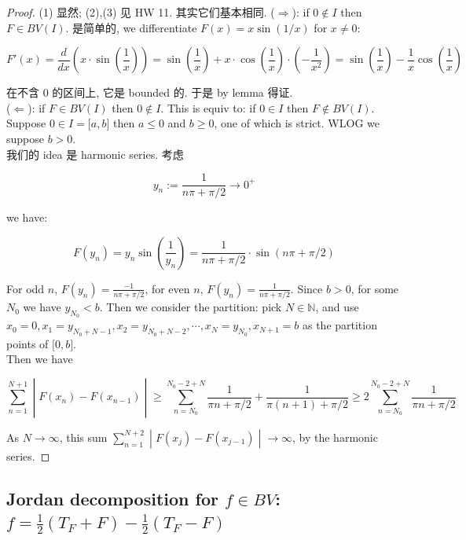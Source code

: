 \begin{proof}

(1) 显然; (2),(3) 见 HW 11. 其实它们基本相同. (\(\Longrightarrow\)): if \(0 \notin I\) then \(F \in BV(I)\). 是简单的, we differentiate \(F(x) = x\sin(1/x)\) for \(x \neq 0\):

\[F'(x) = \frac{d}{dx}\left( {x \cdot \sin\left( \frac{1}{x} \right)} \right) = \sin\left( \frac{1}{x} \right) + x \cdot \cos\left( \frac{1}{x} \right) \cdot \left( {- \frac{1}{x^{2}}} \right) = \sin\left( \frac{1}{x} \right) - \frac{1}{x}\cos\left( \frac{1}{x} \right)\]

在不含 \(0\) 的区间上, 它是 bounded 的. 于是 by lemma 得证.\\
(\(\Longleftarrow\)): if \(F \in BV(I)\) then \(0 \notin I\). This is equiv to: if \(0 \in I\) then \(F \notin BV(I)\).\\
Suppose \(0 \in I = \lbrack a,b\rbrack\) then \(a \leq 0\) and \(b \geq 0\), one of which is strict. WLOG we suppose \(b > 0\).\\
我们的 idea 是 harmonic series. 考虑

\[y_{n} := \frac{1}{n\pi + \pi/2}\rightarrow 0^{+}\]

we have:

\[F\left( y_{n} \right) = y_{n}\sin\left( \frac{1}{y_{n}} \right) = \frac{1}{n\pi + \pi/2} \cdot \sin(n\pi + \pi/2)\]

For odd \(n\), \(F(y_{n}) = \frac{- 1}{n\pi + \pi/2}\), for even \(n\), \(F(y_{n}) = \frac{1}{n\pi + \pi/2}\). Since \(b > 0\), for some \(N_{0}\) we have \(y_{N_{0}} < b\). Then we consider the partition: pick \(N \in \mathbb{N}\), and use \(x_{0} = 0,x_{1} = y_{N_{0} + N - 1},x_{2} = y_{N_{0} + N - 2},\cdots,x_{N} = y_{N_{0}},x_{N + 1} = b\) as the partition points of \(\lbrack 0,b\rbrack\).\\
Then we have

\[\left. \sum\limits_{n = 1}^{N + 1} \middle| F(x_{n}) - F(x_{n - 1}) \middle| \geq \sum\limits_{n = N_{0}}^{N_{0} - 2 + N}\frac{1}{\pi n + \pi/2} + \frac{1}{\pi(n + 1) + \pi/2} \geq 2\sum\limits_{n = N_{0}}^{N_{0} - 2 + N}\frac{1}{\pi n + \pi/2} \right.\]

As \(N\rightarrow\infty\), this sum \(\left. \sum_{n = 1}^{N + 2} \middle| F(x_{j}) - F(x_{j - 1}) \middle| \rightarrow\infty \right.\), by the harmonic series.

\end{proof}

\subsection{\texorpdfstring{Jordan decomposition for \(f \in BV\): \(f = \frac{1}{2}(T_{F} + F) - \frac{1}{2}(T_{F} - F)\)}{Jordan decomposition for f \textbackslash in BV: f = \textbackslash frac\{1\}\{2\}(T\_\{F\} + F) - \textbackslash frac\{1\}\{2\}(T\_\{F\} - F)}}


